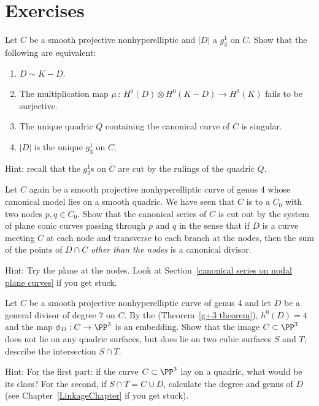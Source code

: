\section{Exercises}

\begin{exercise} \label{ex7.1}
Let $C$ be a smooth projective nonhyperelliptic
%
and $|D|$ a $g^1_3$ on $C$. Show that the following are equivalent:
\begin{enumerate}
\item $D \sim K-D$.
\item The multiplication map $\mu \,{:}\, H^0(D) \otimes H^0(K-D) \to H^0(K)$ fails to be sur\-jec\-tive.
\item The unique quadric $Q$ containing the canonical curve of $C$ is singular.
\item $|D|$ is the unique $g^1_3$ on $C$.
\end{enumerate}

Hint: recall that the $g^1_3$s on $C$ are cut by the rulings of the quadric $Q$.
\end{exercise}

\begin{exercise}\label{ex7.2}
Let $C$ again be a smooth projective nonhyperelliptic curve of genus 4
whose canonical model lies on a smooth quadric. We have seen that $C$ is
%
%
to a
%
$C_0$ with two nodes $p, q \in
C_0$. Show that the canonical series of $C$ is cut out by the system
of plane conic curves passing through $p$ and $q$ in the sense
that if $D$ is a curve meeting $C$ at each node and transverse to each
branch at the nodes, then
the sum of the points of $D\cap C$ \emph{other than the nodes} is a canonical divisor.

Hint: Try
the plane at the nodes. Look at
Section~\ref{canonical series on nodal plane curves} if you get stuck.
\end{exercise}

\begin{exercise}\label{ex7.3}
Let $C$  be a smooth projective nonhyperelliptic curve of genus 4 and
let $D$ be a general divisor of degree 7 on $C$. By the
%
(Theorem~\ref{g+3 theorem}), $h^0(D) = 4$ and the map $\phi_D : C \to
\PP^3$ is an embedding. Show that the image $C \subset \PP^3$ does not
lie on any quadric surfaces, but does lie on two cubic surfaces $S$
and $T$; describe the intersection $S \cap T$.

Hint: For the first part: if the curve $C \subset \PP^3$ lay on a quadric, what would be its class? For the second, if $S \cap T = C \cup D$, calculate the degree and genus of $D$ (see Chapter~\ref{LinkageChapter} if you get stuck).
\end{exercise}

